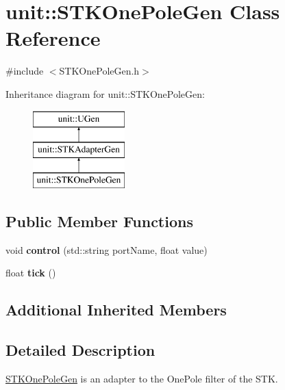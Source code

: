 \hypertarget{classunit_1_1STKOnePoleGen}{\section{unit\-:\-:S\-T\-K\-One\-Pole\-Gen Class Reference}
\label{classunit_1_1STKOnePoleGen}
}


{\ttfamily \#include $<$S\-T\-K\-One\-Pole\-Gen.\-h$>$}

Inheritance diagram for unit\-:\-:S\-T\-K\-One\-Pole\-Gen\-:\begin{figure}[H]
\begin{center}
\leavevmode
\includegraphics[height=3.000000cm]{classunit_1_1STKOnePoleGen}
\end{center}
\end{figure}
\subsection*{Public Member Functions}
\begin{DoxyCompactItemize}
\item 
\hypertarget{classunit_1_1STKOnePoleGen_abafc7a64770438cbde61518a7cf2d94b}{void {\bfseries control} (std\-::string port\-Name, float value)}\label{classunit_1_1STKOnePoleGen_abafc7a64770438cbde61518a7cf2d94b}

\item 
\hypertarget{classunit_1_1STKOnePoleGen_a3bc702fbc334d94eebd409755d1d74e8}{float {\bfseries tick} ()}\label{classunit_1_1STKOnePoleGen_a3bc702fbc334d94eebd409755d1d74e8}

\end{DoxyCompactItemize}
\subsection*{Additional Inherited Members}


\subsection{Detailed Description}
\hyperlink{classunit_1_1STKOnePoleGen}{S\-T\-K\-One\-Pole\-Gen} is an adapter to the One\-Pole filter of the S\-T\-K.


